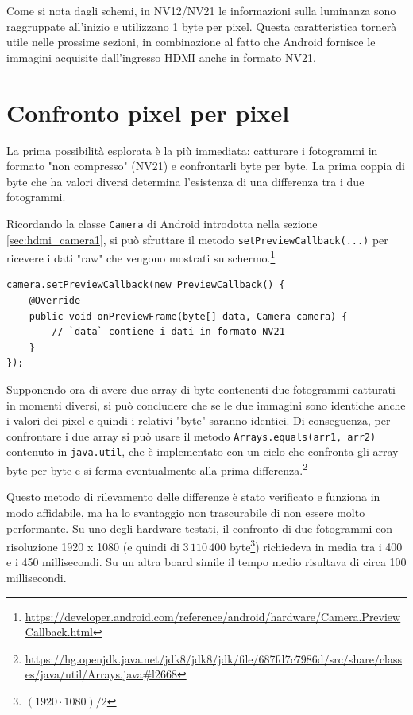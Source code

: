 \begin{figure}[H]
\end{figure}

Come si nota dagli schemi, in NV12/NV21 le informazioni sulla luminanza sono raggruppate all'inizio e utilizzano 1 byte per pixel. Questa caratteristica tornerà utile nelle prossime sezioni, in combinazione al fatto che Android fornisce le immagini acquisite dall'ingresso HDMI anche in formato NV21.

\section{Confronto pixel per pixel}
\label{sec:diff_full}

La prima possibilità esplorata è la più immediata: catturare i fotogrammi in formato "non compresso" (NV21) e confrontarli byte per byte. La prima coppia di byte che ha valori diversi determina l'esistenza di una differenza tra i due fotogrammi.

Ricordando la classe \texttt{Camera} di Android introdotta nella sezione \ref{sec:hdmi_camera1}, si può sfruttare il metodo \texttt{setPreviewCallback(...)} per ricevere i dati "raw" che vengono mostrati su schermo.\footnote{\url{https://developer.android.com/reference/android/hardware/Camera.PreviewCallback.html}}

\begin{verbatim}
camera.setPreviewCallback(new PreviewCallback() {
    @Override
    public void onPreviewFrame(byte[] data, Camera camera) {
        // `data` contiene i dati in formato NV21
    }
});
\end{verbatim}

Supponendo ora di avere due array di byte contenenti due fotogrammi catturati in momenti diversi, si può concludere che se le due immagini sono identiche anche i valori dei pixel e quindi i relativi "byte" saranno identici. Di conseguenza, per confrontare i due array si può usare il metodo \texttt{Arrays.equals(arr1, arr2)} contenuto in \texttt{java.util}, che è implementato con un ciclo che confronta gli array byte per byte e si ferma eventualmente alla prima differenza.\footnote{\url{https://hg.openjdk.java.net/jdk8/jdk8/jdk/file/687fd7c7986d/src/share/classes/java/util/Arrays.java\#l2668}}

Questo metodo di rilevamento delle differenze è stato verificato e funziona in modo affidabile, ma ha lo svantaggio non trascurabile di non essere molto performante. Su uno degli hardware testati, il confronto di due fotogrammi con risoluzione 1920 x 1080 (e quindi di $3\,110\,400$ byte\footnote{$(1920 \cdot 1080) / 2$}) richiedeva in media tra i 400 e i 450 millisecondi. Su un altra board simile il tempo medio risultava di circa 100 millisecondi.

